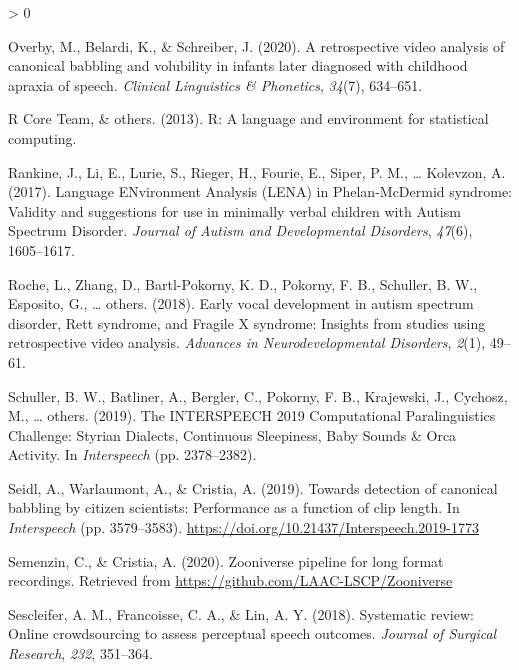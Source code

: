 \documentclass[
  english,
  ,man]{apa6}
\newlength{\cslhangindent}
\newenvironment{CSLReferences}[2] %
 {%
  \setlength{\parindent}{0pt}
  \ifodd #1 \everypar{\setlength{\hangindent}{\cslhangindent}}\ignorespaces\fi
  \ifnum #2 > 0
  \setlength{\parskip}{#2\baselineskip}
  \fi
 }%
 {}
\begin{document}
\begin{CSLReferences}{1}{0}
\leavevmode\hypertarget{ref-overby2020retrospective}{}%
Overby, M., Belardi, K., \& Schreiber, J. (2020). A retrospective video analysis of canonical babbling and volubility in infants later diagnosed with childhood apraxia of speech. \emph{Clinical Linguistics \& Phonetics}, \emph{34}(7), 634--651.

\leavevmode\hypertarget{ref-team2013r}{}%
R Core Team, \& others. (2013). R: A language and environment for statistical computing.

\leavevmode\hypertarget{ref-rankine2017language}{}%
Rankine, J., Li, E., Lurie, S., Rieger, H., Fourie, E., Siper, P. M., \ldots{} Kolevzon, A. (2017). {Language ENvironment Analysis (LENA) in Phelan-McDermid syndrome: Validity and suggestions for use in minimally verbal children with Autism Spectrum Disorder}. \emph{Journal of Autism and Developmental Disorders}, \emph{47}(6), 1605--1617.

\leavevmode\hypertarget{ref-roche2018early}{}%
Roche, L., Zhang, D., Bartl-Pokorny, K. D., Pokorny, F. B., Schuller, B. W., Esposito, G., \ldots{} others. (2018). {Early vocal development in autism spectrum disorder, Rett syndrome, and Fragile X syndrome: Insights from studies using retrospective video analysis}. \emph{Advances in Neurodevelopmental Disorders}, \emph{2}(1), 49--61.

\leavevmode\hypertarget{ref-schuller2019interspeech}{}%
Schuller, B. W., Batliner, A., Bergler, C., Pokorny, F. B., Krajewski, J., Cychosz, M., \ldots{} others. (2019). {The INTERSPEECH 2019 Computational Paralinguistics Challenge: Styrian Dialects, Continuous Sleepiness, Baby Sounds \& Orca Activity}. In \emph{Interspeech} (pp. 2378--2382).

\leavevmode\hypertarget{ref-Seidl19}{}%
Seidl, A., Warlaumont, A., \& Cristia, A. (2019). Towards detection of canonical babbling by citizen scientists: Performance as a function of clip length. In \emph{Interspeech} (pp. 3579--3583). \url{https://doi.org/10.21437/Interspeech.2019-1773}

\leavevmode\hypertarget{ref-semenzin2020zooniverse}{}%
Semenzin, C., \& Cristia, A. (2020). Zooniverse pipeline for long format recordings. Retrieved from \url{https://github.com/LAAC-LSCP/Zooniverse}

\leavevmode\hypertarget{ref-sescleifer2018systematic}{}%
Sescleifer, A. M., Francoisse, C. A., \& Lin, A. Y. (2018). Systematic review: Online crowdsourcing to assess perceptual speech outcomes. \emph{Journal of Surgical Research}, \emph{232}, 351--364.


\end{CSLReferences}
\end{document}
